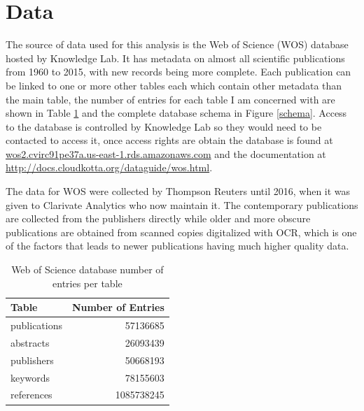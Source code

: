 \documentclass[12pt, a4paper]{article}
\begin{document}
\section{Data}

The source of data used for this analysis is the  Web of Science (WOS) database hosted by Knowledge Lab. It has metadata on almost all scientific publications from 1960 to 2015, with new records being more complete. Each publication can be linked to one or more other tables each which contain other metadata than the main table, the number of entries for each table I am concerned with are shown in Table \ref{wos} and the complete database schema in Figure \ref{schema}. Access to the database is controlled by Knowledge Lab so they would need to be contacted to access it, once access rights are obtain the database is found at \href{wos2.cvirc91pe37a.us-east-1.rds.amazonaws.com}{wos2.cvirc91pe37a.us-east-1.rds.amazonaws.com} and the documentation at \href{http://docs.cloudkotta.org/dataguide/wos.html}{http://docs.cloudkotta.org/dataguide/wos.html}.

The data for WOS were collected by Thompson Reuters until 2016, when it was given to  Clarivate Analytics who now maintain it. The contemporary publications are collected from the publishers directly while older and more obscure publications are obtained from scanned copies digitalized with OCR, which is one of the factors that leads to newer publications having much higher quality data.

\begin{table} [!ht]
	\centering
	\begin{tabular}{lr}
		\toprule
		Table & Number of Entries\\
		\midrule
		publications & 57136685\\
		abstracts &	26093439\\
		publishers & 50668193\\
		keywords &	78155603\\
		references &	1085738245\\
		\bottomrule
	\end{tabular}
	\caption{Web of Science database number of entries per table}\label{wos}
\end{table}
\end{document}
